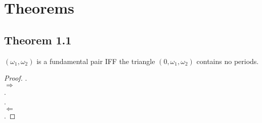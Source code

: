 \newpage
\section{Theorems}

\subsection*{Theorem 1.1}

\begin{proposition}
    $(\omega_1, \omega_2)$ is a fundamental pair IFF the triangle $(0, \omega_1, \omega_2)$ contains no periods.
\end{proposition}

\begin{proof}
    . \\
    $\Rightarrow$ \\
    . \\
    . \\
    $\Leftarrow$ \\
    .
\end{proof}